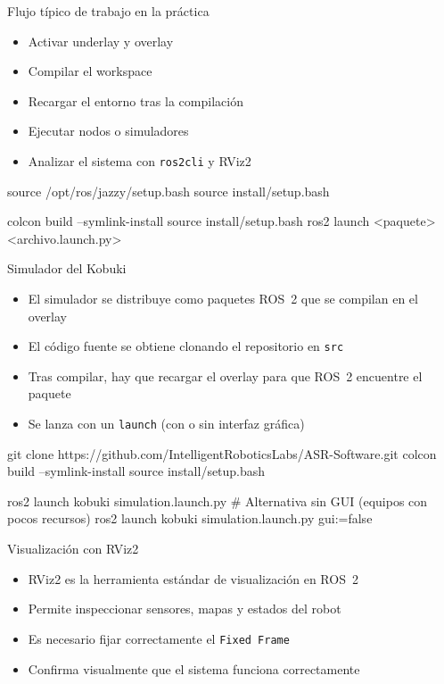 \documentclass[aspectratio=169]{beamer}
\begin{document}
\begin{frame}[fragile]{Flujo típico de trabajo en la práctica}
\small
\begin{itemize}
  \item Activar underlay y overlay
  \item Compilar el workspace
  \item Recargar el entorno tras la compilación
  \item Ejecutar nodos o simuladores
  \item Analizar el sistema con \texttt{ros2cli} y RViz2
\end{itemize}
\vspace{2mm}
\begin{terminal}
source /opt/ros/jazzy/setup.bash
source install/setup.bash

colcon build --symlink-install
source install/setup.bash
ros2 launch <paquete> <archivo.launch.py>
\end{terminal}
\end{frame}

\begin{frame}[fragile]{Simulador del Kobuki}
\small
\begin{itemize}
  \item El simulador se distribuye como paquetes ROS~2 que se compilan en el overlay
  \item El código fuente se obtiene clonando el repositorio en \texttt{src}
  \item Tras compilar, hay que recargar el overlay para que ROS~2 encuentre el paquete
  \item Se lanza con un \texttt{launch} (con o sin interfaz gráfica)
\end{itemize}
\vspace{2mm}
\begin{terminal}
git clone https://github.com/IntelligentRoboticsLabs/ASR-Software.git
colcon build --symlink-install
source install/setup.bash

ros2 launch kobuki simulation.launch.py
# Alternativa sin GUI (equipos con pocos recursos)
ros2 launch kobuki simulation.launch.py gui:=false
\end{terminal}
\end{frame}

\begin{frame}{Visualización con RViz2}
\small
\begin{itemize}
  \item RViz2 es la herramienta estándar de visualización en ROS~2
  \item Permite inspeccionar sensores, mapas y estados del robot
  \item Es necesario fijar correctamente el \texttt{Fixed Frame}
  \item Confirma visualmente que el sistema funciona correctamente
\end{itemize}
\end{frame}
\end{document}
